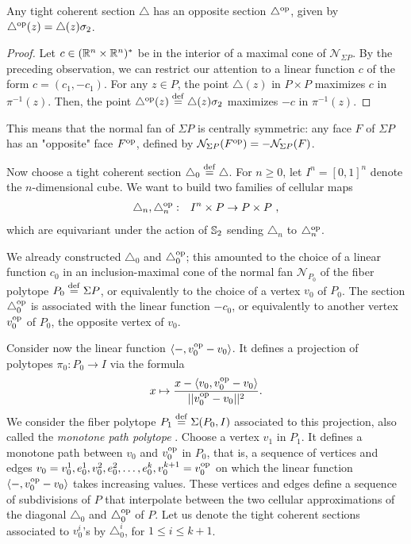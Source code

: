\begin{proposition}
	Any tight coherent section $\triangle$ has an opposite section $\triangle^{\op}$, given by $\triangle^{\op}(z)=\triangle(z)\sigma_2$.
\end{proposition}

\begin{proof}
	Let $c\in (\R^n\times\R^n)^{*}$ be in the interior of a maximal cone of $\mathcal{N}_{\Sigma P}$.
	By the preceding observation, we can restrict our attention to a linear function $c$ of the form $c=(c_1,-c_1)$.
	For any $z\in P$, the point $\triangle(z)$ in $P\times P$ maximizes $c$ in $\pi^{-1}(z)$.
	Then, the point $\triangle^{\op}(z) \defeq \triangle(z)\sigma_2$ maximizes $-c$ in $\pi^{-1}(z)$.
\end{proof}

This means that the normal fan of $\Sigma P$ is centrally symmetric: any face $F$ of $\Sigma P$ has an "opposite" face $F^{\op}$, defined by $\mathcal{N}_{\Sigma P}(F^{\op})=-\mathcal{N}_{\Sigma P}(F)$.

Now choose a tight coherent section $\triangle_0\defeq\triangle$.
For $n\geq 0$, let $I^n=[0,1]^n$ denote the $n$-dimensional cube.
We want to build two families of cellular maps
\begin{eqnarray*}
\triangle_n, \triangle^{\op}_n & : & I^n \times P \to P\times P  \ ,
\end{eqnarray*}
which are equivariant under the action of $\S_2$ sending $\triangle_n$ to $\triangle^{\op}_n$.

We already constructed $\triangle_0$ and $\triangle^{\op}_0$; this amounted to the choice of a linear function $c_0$ in an inclusion-maximal cone of the normal fan $\mathcal{N}_{P_0}$ of the fiber polytope $P_0\defeq\Sigma P$, or equivalently to the choice of a vertex $v_0$ of $P_0$.
The section $\triangle^{\op}_0$ is associated with the linear function $-c_0$, or equivalently to another vertex $v^{\op}_0$ of $P_0$, the opposite vertex of $v_0$.

Consider now the linear function $\langle - , v^{\op}_0-v_0 \rangle$.
It defines a projection of polytopes $\pi_0 \colon P_0 \to I$ via the formula
\[
x \mapsto \frac{x-\langle v_0, v^{\op}_0-v_0 \rangle}{||v^{\op}_0-v_0||^2}.
\]
We consider the fiber polytope $P_1 \defeq \Sigma(P_0,I)$ associated to this projection, also called the \emph{monotone path polytope} \cite[Chapter 9]{Ziegler95}.
Choose a vertex $v_1$ in $P_1$.
It defines a monotone path between $v_0$ and $v^{\op}_0$ in $P_0$, that is, a sequence of vertices and edges $v_0 = v_0^1, e_0^1, v_0^2, e_0^2, \dots, e_0^k, v_0^{k+1} = v^{\op}_0$ on which the linear function $\langle - , v^{\op}_0-v_0 \rangle$ takes increasing values.
These vertices and edges define a sequence of subdivisions of $P$ that interpolate between the two cellular approximations of the diagonal $\triangle_0$ and $\triangle^{\op}_0$ of $P$.
Let us denote the tight coherent sections associated to $v_0^i$'s by $\triangle_0^i$, for $1 \leq i \leq k+1$.

